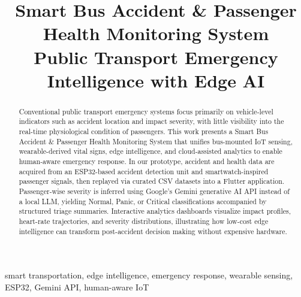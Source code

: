 \documentclass[conference]{IEEEtran}
\begin{document}
\title{Smart Bus Accident \& Passenger Health Monitoring System\\
Public Transport Emergency Intelligence with Edge AI}

\author{%
    \and
}

\maketitle

\begin{abstract}
Conventional public transport emergency systems focus primarily on vehicle-level indicators such as accident location and impact severity, with little visibility into the real-time physiological condition of passengers.
This work presents a Smart Bus Accident \& Passenger Health Monitoring System that unifies bus-mounted IoT sensing, wearable-derived vital signs, edge intelligence, and cloud-assisted analytics to enable human-aware emergency response.
In our prototype, accident and health data are acquired from an ESP32-based accident detection unit and smartwatch-inspired passenger signals, then replayed via curated CSV datasets into a Flutter application.
Passenger-wise severity is inferred using Google's Gemini generative AI API instead of a local LLM, yielding Normal, Panic, or Critical classifications accompanied by structured triage summaries.
Interactive analytics dashboards visualize impact profiles, heart-rate trajectories, and severity distributions, illustrating how low-cost edge intelligence can transform post-accident decision making without expensive hardware.
\end{abstract}

\begin{IEEEkeywords}
smart transportation, edge intelligence, emergency response, wearable sensing, ESP32, Gemini API, human-aware IoT
\end{IEEEkeywords}
\end{document}

